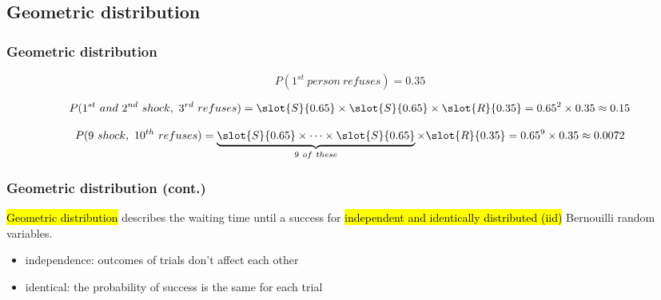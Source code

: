 \documentclass[slidestop,compress,mathserif]{beamer}
\newcommand{\soln}[1]{\textit{#1}}
\begin{document}

\subsection{Geometric distribution}


\begin{frame}
\frametitle{Geometric distribution}

{\small


\[ P(1^{st}~person~refuses) = 0.35 \]

\pause

\[ P(1^{st}~and~2^{nd}~shock,~3^{rd}~refuses) = \slot{S}{0.65} \times \slot{S}{0.65} \times  \slot{R}{0.35} = 0.65^2 \times 0.35 \approx 0.15 \]

\pause

\soln{
\pause
\[ P(9~shock,~10^{th}~refuses) = \underbrace{\slot{S}{0.65} \times \cdots \times \slot{S}{0.65}}_{9~of~these} \times  \slot{R}{0.35} = 0.65^9 \times 0.35 \approx 0.0072 \]
}
}

\end{frame}


\begin{frame}
\frametitle{Geometric distribution (cont.)}

\hl{Geometric distribution} describes the waiting time until a success for \hl{independent and identically distributed (iid)} Bernouilli random variables.
\begin{itemize}
\item independence: outcomes of trials don't affect each other
\item identical: the probability of success is the same for each trial
\end{itemize}

$\:$ \\
$\:$ \\

\pause


\end{frame}
\end{document}
